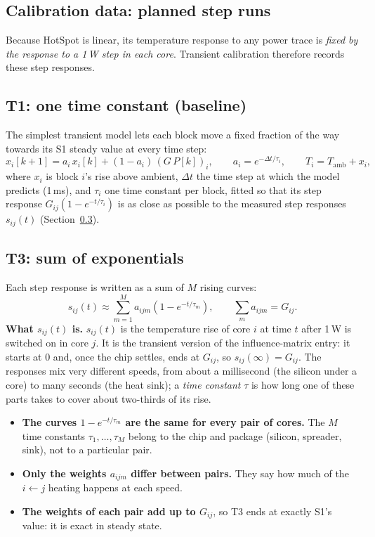 \documentclass[11pt,a4paper]{article}
\begin{document}
\subsection{Calibration data: planned step runs}\label{sec:steps}
Because HotSpot is linear, its temperature response to any power trace is \emph{fixed by the
response to a 1\,W step in each core}. Transient calibration therefore records these step responses.

\subsection{T1: one time constant (baseline)}
The simplest transient model lets each block move a fixed fraction of the way towards its S1
steady value at every time step:
\begin{equation}
  x_i[k+1] = a_i\, x_i[k] + (1 - a_i)\,(G\,P[k])_i, \qquad a_i = e^{-\Delta t/\tau_i},
  \qquad T_i = T_\text{amb} + x_i,
  \label{eq:t1}
\end{equation}
where $x_i$ is block $i$'s rise above ambient, $\Delta t$ the time step at which the model predicts
(1\,ms), and $\tau_i$ one time constant per block, fitted so that its step response
$G_{ij}(1 - e^{-t/\tau_i})$ is as close as possible to the measured step responses $s_{ij}(t)$
(Section~\ref{sec:t3}).

\subsection{T3: sum of exponentials}\label{sec:t3}
Each step response is written as a sum of $M$ rising curves:
\begin{equation}
  s_{ij}(t) \approx \sum_{m=1}^{M} a_{ijm}\left(1 - e^{-t/\tau_m}\right),
  \qquad \sum_m a_{ijm} = G_{ij}.
  \label{eq:t3}
\end{equation}
\textbf{What $s_{ij}(t)$ is.} $s_{ij}(t)$ is the temperature rise of core $i$ at time $t$ after
1\,W is switched on in core $j$. It is the transient version of the influence-matrix entry: it
starts at 0 and, once the chip settles, ends at $G_{ij}$, so $s_{ij}(\infty) = G_{ij}$. The
responses mix very different speeds, from about a millisecond (the silicon under a core) to many
seconds (the heat sink); a \emph{time constant} $\tau$ is how long one of these parts takes to cover
about two-thirds of its rise.
\begin{itemize}
  \item \textbf{The curves $1 - e^{-t/\tau_m}$ are the same for every pair of cores.} The $M$ time
        constants $\tau_1, \dots, \tau_M$ belong to the chip and package (silicon, spreader, sink),
        not to a particular pair.
  \item \textbf{Only the weights $a_{ijm}$ differ between pairs.} They say how much of the
        $i \leftarrow j$ heating happens at each speed.
  \item \textbf{The weights of each pair add up to $G_{ij}$}, so T3 ends at exactly S1's value:
        it is exact in steady state.
\end{itemize}
\end{document}
